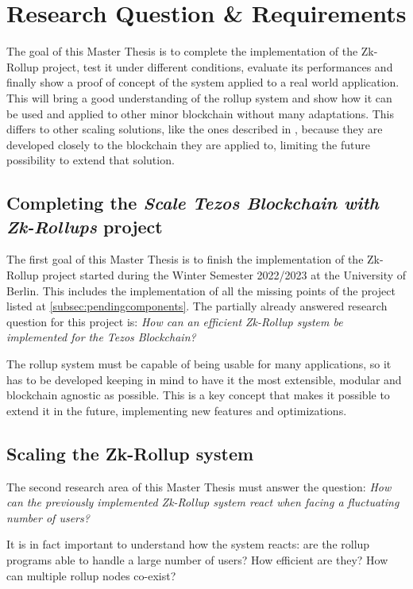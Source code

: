 \chapter{Research Question \& Requirements\label{cha:chapter3}}
The goal of this Master Thesis is to complete the implementation of the Zk-Rollup project, test it under different conditions, evaluate its performances and finally show a proof of concept of the system applied to a real world application. This will bring a good understanding of the rollup system and show how it can be used and applied to other minor blockchain without many adaptations. This differs to other scaling solutions, like the ones described in \cite{yang_review_2020}, because they are developed closely to the blockchain they are applied to, limiting the future possibility to extend that solution.

\section{Completing the \textit{Scale Tezos Blockchain with Zk-Rollups} project}
The first goal of this Master Thesis is to finish the implementation of the Zk-Rollup project started during the Winter Semester 2022/2023 at the University of Berlin. This includes the implementation of all the missing points of the project listed at \ref{subsec:pendingcomponents}. The partially already answered research question for this project is: \textit{How can an efficient Zk-Rollup system be implemented for the Tezos Blockchain?}

The rollup system must be capable of being usable for many applications, so it has to be developed keeping in mind to have it the most extensible, modular and blockchain agnostic as possible. This is a key concept that makes it possible to extend it in the future, implementing new features and optimizations.

\section{Scaling the Zk-Rollup system}
The second research area of this Master Thesis must answer the question: \textit{How can the previously implemented  Zk-Rollup system react when facing a fluctuating number of users?}

It is in fact important to understand how the system reacts: are the rollup programs able to handle a large number of users? How efficient are they? How can multiple rollup nodes co-exist?

